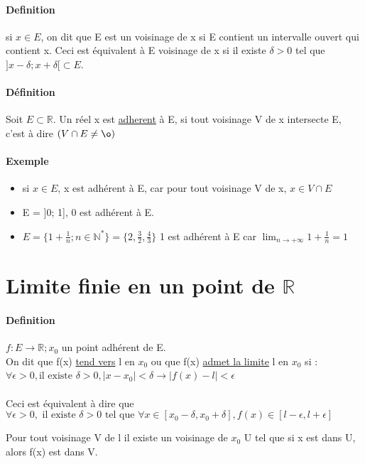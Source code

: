 \paragraph{Definition} si $x \in E$, on dit que E est un voisinage de x si E contient un intervalle ouvert qui contient x. Ceci est équivalent à E voisinage de x si il existe $\delta > 0$  tel que $]x - \delta; x + \delta[ \subset E$.

\paragraph{Définition} Soit $E \subset \mathbb{R}$. Un réel x est \ul{adherent} à E, si tout voisinage V de x intersecte E, c'est à dire $(V \cap E \neq \o)$

\paragraph{Exemple} 
\begin{itemize}
	\item si $x \in E$, x est adhérent à E, car pour tout voisinage V de x, $x \in V \cap E$
	\item E = ]0; 1], 0 est adhérent à E.
	\item $E = \{1 + \frac{1}{n}; n \in \mathbb{N}^*\} = \{2, \frac{3}{2}, \frac{4}{3}\}$
	1 est adhérent à E car $\lim_{n \to +\infty}1+\frac{1}{n} = 1$
\end{itemize}

\section{Limite finie en un point de $\mathbb{R}$}

\paragraph{Definition} $f : E \rightarrow \mathbb{R}; x_0$ un point adhérent de E. ~\\
On dit que f(x) \ul{tend vers} l en $x_0$ ou que f(x) \ul{admet la limite} l en $x_0$ si :
$\forall \epsilon > 0, \text{il existe } \delta > 0, |x - x_0| < \delta \rightarrow |f(x) - l| < \epsilon$
~\\
~\\ 
Ceci est équivalent à dire que $\forall \epsilon > 0, \text{ il existe } \delta > 0 \text{ tel que } \forall x \in [x_0-\delta, x_0+\delta], f(x) \in [l-\epsilon, l+\epsilon]$

Pour tout voisinage V de l il existe un voisinage de $x_0$ U tel que si x est dans U, alors f(x) est dans V.
